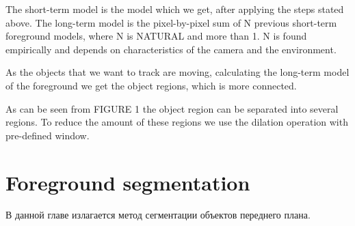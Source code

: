 \documentclass[12pt,a4paper,oneside,titlepage]{article}
\begin{document}


The short-term model is the model which we get, after applying the steps stated above.
The long-term model is the pixel-by-pixel sum of N previous short-term foreground models, where N is NATURAL and more than 1.  
N is found empirically and depends on characteristics of the camera and the environment.

As the objects that we want to track are moving, calculating the long-term model of  the foreground we get the object regions, which is more connected.

As can be seen from FIGURE 1 the object region can be separated into several regions.
To reduce the amount of these regions we use the dilation operation with pre-defined window.





\newpage
\section*{Foreground segmentation}
В данной главе излагается метод сегментации объектов переднего плана.
\end{document}
